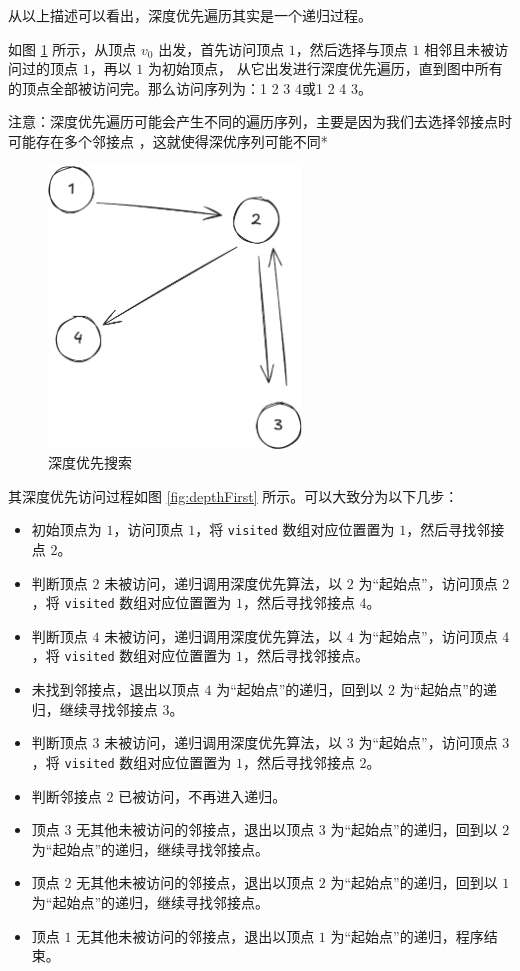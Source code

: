 \documentclass[lang=cn,newtx,10pt,scheme=chinese]{elegantbook}
\begin{document}
从以上描述可以看出，深度优先遍历其实是一个递归过程。

如图 \ref{fig:DFS} 所示，从顶点 $v_0$ 出发，首先访问顶点 $1$，然后选择与顶点 $1$ 相邻且未被访问过的顶点 $1$，再以 $1$ 为初始顶点，
从它出发进行深度优先遍历，直到图中所有的顶点全部被访问完。那么访问序列为：1 2 3 4或1 2 4 3。

注意：深度优先遍历可能会产生不同的遍历序列，主要是因为我们去选择邻接点时可能存在多个邻接点 ，这就使得深优序列可能不同*

\begin{figure}[h!]
  \centering
  \includegraphics[width=0.6\textwidth]{./figure/pdf/cropped/depthFirstGraph.pdf}
  \caption{深度优先搜索}
  \label{fig:DFS}
\end{figure}

其深度优先访问过程如图 \ref{fig:depthFirst} 所示。可以大致分为以下几步：

\begin{itemize}
  \item 初始顶点为 $1$，访问顶点 $1$，将 \texttt{visited} 数组对应位置置为 $1$，然后寻找邻接点 $2$。  
  \item 判断顶点 $2$ 未被访问，递归调用深度优先算法，以 $2$ 为“起始点”，访问顶点 $2$，将 \texttt{visited} 数组对应位置置为 $1$，然后寻找邻接点 $4$。  
  \item 判断顶点 $4$ 未被访问，递归调用深度优先算法，以 $4$ 为“起始点”，访问顶点 $4$，将 \texttt{visited} 数组对应位置置为 $1$，然后寻找邻接点。  
  \item 未找到邻接点，退出以顶点 $4$ 为“起始点”的递归，回到以 $2$ 为“起始点”的递归，继续寻找邻接点 $3$。  
  \item 判断顶点 $3$ 未被访问，递归调用深度优先算法，以 $3$ 为“起始点”，访问顶点 $3$，将 \texttt{visited} 数组对应位置置为 $1$，然后寻找邻接点 $2$。  
  \item 判断邻接点 $2$ 已被访问，不再进入递归。  
  \item 顶点 $3$ 无其他未被访问的邻接点，退出以顶点 $3$ 为“起始点”的递归，回到以 $2$ 为“起始点”的递归，继续寻找邻接点。  
  \item 顶点 $2$ 无其他未被访问的邻接点，退出以顶点 $2$ 为“起始点”的递归，回到以 $1$ 为“起始点”的递归，继续寻找邻接点。  
  \item 顶点 $1$ 无其他未被访问的邻接点，退出以顶点 $1$ 为“起始点”的递归，程序结束。
\end{itemize}
\end{document}
